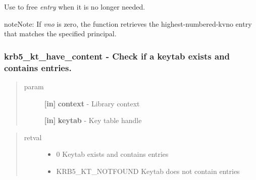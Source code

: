 \documentclass[letterpaper,10pt,english]{sphinxmanual}
\begin{document}
Use {\hyperref[appdev/refs/api/krb5_free_keytab_entry_contents:krb5_free_keytab_entry_contents]{}} to free \emph{entry} when it is no longer needed.

\begin{notice}{note}{Note:}
If \emph{vno} is zero, the function retrieves the highest-numbered-kvno entry that matches the specified principal.
\end{notice}


\subsubsection{krb5\_kt\_have\_content -  Check if a keytab exists and contains entries.}
\label{appdev/refs/api/krb5_kt_have_content::doc}\label{appdev/refs/api/krb5_kt_have_content:krb5-kt-have-content-check-if-a-keytab-exists-and-contains-entries}

\begin{fulllineitems}
\label{appdev/refs/api/krb5_kt_have_content:krb5_kt_have_content}
\end{fulllineitems}

\begin{quote}\begin{description}
\item[{param}] \leavevmode
\textbf{{[}in{]}} \textbf{context} - Library context

\textbf{{[}in{]}} \textbf{keytab} - Key table handle

\end{description}\end{quote}
\begin{quote}\begin{description}
\item[{retval}] \leavevmode\begin{itemize}
\item {} 
0   Keytab exists and contains entries

\item {} 
KRB5\_KT\_NOTFOUND   Keytab does not contain entries

\end{itemize}

\end{description}\end{quote}
\end{document}
